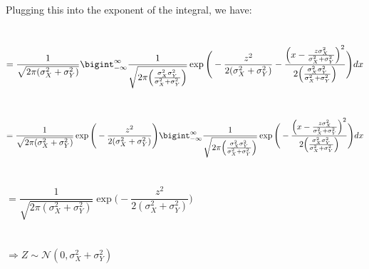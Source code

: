 \documentclass[submit]{harvardml}
\newcommand{\N}{\mathcal{N}}
\begin{document}
Plugging this into the exponent of the integral, we have:\\\\\\
$=\displaystyle\dfrac{1}{\sqrt{2\pi(\sigma_X^{2}+\sigma_Y^{2})}}\displaystyle\bigint_{-\infty}^{\infty}\displaystyle\dfrac{1}{\sqrt{2\pi\Big(\frac{\sigma_X^{2}\sigma_Y^{2}}{\sigma_X^{2}+\sigma_Y^{2}}\Big)}}\exp\Bigg(-\dfrac{z^2}{2(\sigma_X^2+\sigma_Y^2)}-\dfrac{\Big(x-\frac{z\sigma_X^2}{\sigma_X^2+\sigma_Y^2}\Big)^2}{2\Big(\frac{\sigma_X^2\sigma_Y^2}{\sigma_X^2+\sigma_Y^2}\Big)}\Bigg)dx$\\\\\\
$=\displaystyle\dfrac{1}{\sqrt{2\pi(\sigma_X^{2}+\sigma_Y^{2})}}\exp\Bigg(-\dfrac{z^2}{2(\sigma_X^2+\sigma_Y^2)}\Bigg)\displaystyle\bigint_{-\infty}^{\infty}\displaystyle\dfrac{1}{\sqrt{2\pi\Big(\frac{\sigma_X^{2}\sigma_Y^{2}}{\sigma_X^{2}+\sigma_Y^{2}}\Big)}}\exp\Bigg(-\dfrac{\Big(x-\frac{z\sigma_X^2}{\sigma_X^2+\sigma_Y^2}\Big)^2}{2\Big(\frac{\sigma_X^2\sigma_Y^2}{\sigma_X^2+\sigma_Y^2}\Big)}\Bigg)dx$\\\\\\
$=\displaystyle\dfrac{1}{\sqrt{2\pi(\sigma_X^{2}+\sigma_Y^{2})}}\exp\Bigg(-\dfrac{z^2}{2(\sigma_X^2+\sigma_Y^2)}\Bigg)$\\\\\\
$\Rightarrow Z\sim\N(0,\sigma_X^{2}+\sigma_Y^{2})$\\\\\\
\end{document}
